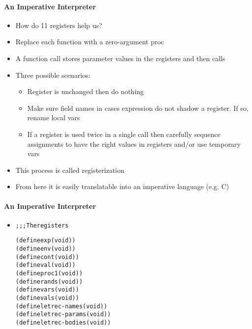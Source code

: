 \documentclass{beamer}
\begin{document}
\begin{frame}[fragile]
\framesubtitle{An Imperative Interpreter}
\begin{scriptsize}
\begin{itemize}
\item<1-> How do 11 registers help us?

\item<2-> Replace each function with a zero-argument proc

\item<2-> A function call stores parameter values in the registers and then calls
    
\item<3-> Three possible scenarios:
\begin{itemize}
\item Register is unchanged then do nothing

\item Make sure field names in cases expression do not shadow a register. If so, rename local vars

\item If a register is used twice in a single call then carefully sequence assignments to have the right values in registers and/or use temporary vars
\end{itemize}

\item<3->This process is called registerization

\item<3-> From here it is easily translatable into an imperative language (e.g. C)

\end{itemize}
\end{scriptsize}
\end{frame}

\begin{frame}[fragile]
\framesubtitle{An Imperative Interpreter}
\begin{scriptsize}
\begin{itemize}
\item<1-> 
\begin{alltt}
;;; The registers

(define exp   (void))
(define env   (void))
(define cont  (void))
(define val   (void))
(define proc1 (void))
(define rands (void))
(define vars  (void))
(define vals  (void))
(define letrec-names  (void))
(define letrec-params (void))
(define letrec-bodies (void))
\end{alltt}


\end{itemize}
\end{scriptsize}
\end{frame}
\end{document}
